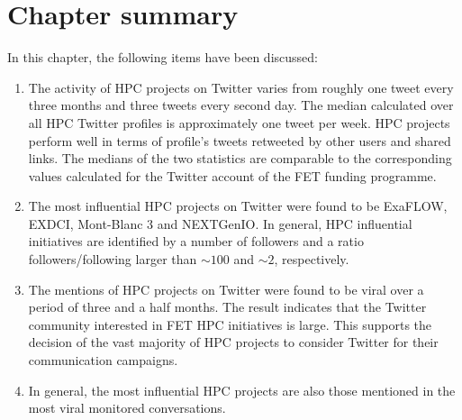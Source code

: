 \section{Chapter summary}
In this chapter, the following items have been discussed:

\begin{enumerate}
 \item The activity of HPC projects on Twitter varies from roughly one tweet every three months and three tweets every second day. The median calculated over all HPC Twitter profiles is approximately one tweet per week. HPC projects perform well in terms of profile's tweets retweeted by other users and shared links. The medians of the two statistics are comparable to the corresponding values calculated for the Twitter account of the FET funding programme.
 \item The most influential HPC projects on Twitter were found to be ExaFLOW, EXDCI, Mont-Blanc 3 and NEXTGenIO. In general, HPC influential initiatives are identified by a number of followers and a ratio followers/following larger than $\sim 100$ and $\sim 2$, respectively. 
 \item The mentions of HPC projects on Twitter were found to be viral over a period of three and a half months. The result indicates that the Twitter community interested in FET HPC initiatives is large. This supports the decision of the vast majority of HPC projects to consider Twitter for their communication campaigns.
 \item In general, the most influential HPC projects are also those mentioned in the most viral monitored conversations.    
\end{enumerate}  


